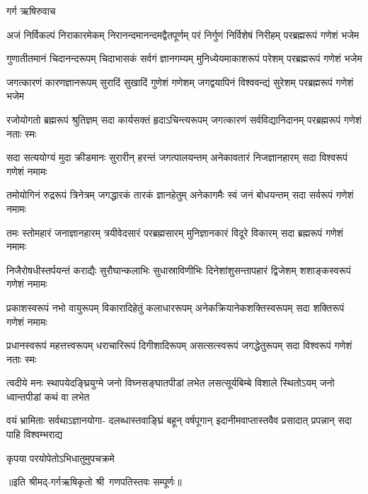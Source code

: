 
गर्ग ऋषिरुवाच

\fourlineindentedshloka
{अजं निर्विकल्पं निराकारमेकम्}
{निरानन्दमानन्दमद्वैतपूर्णम्}
{परं निर्गुणं निर्विशेषं निरीहम्}
{परब्रह्मरूपं गणेशं भजेम}%

\fourlineindentedshloka
{गुणातीतमानं चिदानन्दरूपम्}
{चिदाभासकं सर्वगं ज्ञानगम्यम्}
{मुनिध्येयमाकाशरूपं परेशम्}
{परब्रह्मरूपं गणेशं भजेम}%

\fourlineindentedshloka
{जगत्कारणं कारणज्ञानरूपम्}
{सुरादिं सुखादिं गुणेशं गणेशम्}
{जगद्वयापिनं विश्ववन्द्यं सुरेशम्}
{परब्रह्मरूपं गणेशं भजेम}%

\fourlineindentedshloka
{रजोयोगतो ब्रह्मरूपं श्रुतिज्ञम्}
{सदा कार्यसक्तं हृदाऽचिन्त्यरूपम्}
{जगत्कारणं सर्वविद्यानिदानम्}
{परब्रह्मरूपं गणेशं नताः स्मः}%

\fourlineindentedshloka
{सदा सत्ययोग्यं मुदा क्रीडमानः}
{सुरारीन् हरन्तं जगत्पालयन्तम्}
{अनेकावतारं निजज्ञानहारम्}
{सदा विश्वरूपं गणेशं नमामः}%


\fourlineindentedshloka
{तमोयोगिनं रुद्ररूपं त्रिनेत्रम्}
{जगद्धारकं तारकं ज्ञानहेतुम्}
{अनेकागमैः स्वं जनं बोधयन्तम्}
{सदा सर्वरूपं गणेशं नमामः}%

\fourlineindentedshloka
{तमः स्तोमहारं जनाज्ञानहारम्}
{त्रयीवेदसारं परब्रह्मसारम्}
{मुनिज्ञानकारं विदूरे विकारम्}
{सदा ब्रह्मरूपं गणेशं नमामः}%

\fourlineindentedshloka
{निजैरोषधीस्तर्पयन्तं कराद्यैः}
{सुरौघान्कलाभिः सुधास्राविणीभिः}
{दिनेशांशुसन्तापहारं द्विजेशम्}
{शशाङ्कस्वरूपं गणेशं नमामः}%

\fourlineindentedshloka
{प्रकाशस्वरूपं नभो वायुरूपम्}
{विकारादिहेतुं कलाधाररूपम्}
{अनेकक्रियानेकशक्तिस्वरूपम्}
{सदा शक्तिरूपं गणेशं नमामः}%

\fourlineindentedshloka
{प्रधानस्वरूपं महत्तत्त्वरूपम्}
{धराचारिरूपं दिगीशादिरूपम्}
{असत्सत्स्वरूपं जगद्धेतुरूपम्}
{सदा विश्वरूपं गणेशं नताः स्मः}%

\fourlineindentedshloka
{त्वदीये मनः स्थापयेदङ्घ्रियुग्मे}
{जनो विघ्नसङ्घातपीडां लभेत}
{लसत्सूर्यबिम्बे विशाले स्थितोऽयम्}
{जनो ध्वान्तपीडां कथं वा लभेत}%

\fourlineindentedshloka
{वयं भ्रामिताः सर्वथाऽज्ञानयोगा-}
{दलब्धास्तवाङ्घ्रिं बहून् वर्षपूगान्}
{इदानीमवाप्तास्तवैव प्रसादात्}
{प्रपन्नान् सदा पाहि विश्वम्भराद्य}%

{कृपया परयोपेतोऽभिधातुमुपचक्रमे}%

॥इति श्रीमद्-गर्गऋषिकृतो श्री~गणपतिस्तवः सम्पूर्णः॥